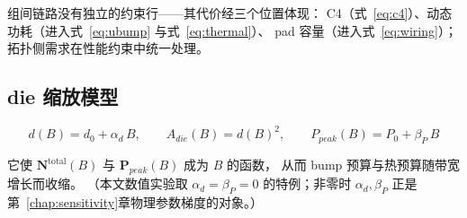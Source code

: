 组间链路没有独立的约束行——其代价经三个位置体现：
C4（式~\eqref{eq:c4}）、动态功耗（进入式~\eqref{eq:ubump} 与式~\eqref{eq:thermal}）、
pad 容量（进入式~\eqref{eq:wiring}）；拓扑侧需求在性能约束中统一处理。

\subsection{die 缩放模型}\label{sec:ov-diescale}

\begin{equation}\label{eq:die-scale}
    d(B) = d_0 + \alpha_d\,B,\qquad
    A_{die}(B) = d(B)^2,\qquad
    P_{peak}(B) = P_0 + \beta_P\,B
\end{equation}

它使 $\mathbf{N}^{\text{total}}(B)$ 与 $\mathbf{P}_{peak}(B)$ 成为 $B$ 的函数，
从而 bump 预算与热预算随带宽增长而收缩。
（本文数值实验取 $\alpha_d=\beta_P=0$ 的特例；非零时 $\alpha_d,\beta_P$ 正是第~\ref{chap:sensitivity}章物理参数梯度的对象。）
